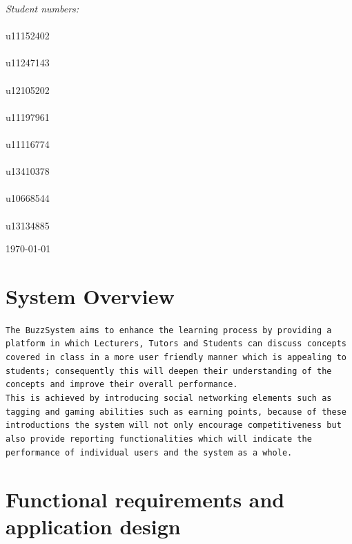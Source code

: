 \documentclass[a4paper,12pt]{report}
\begin{document}
\begin{titlepage}
\begin{center}
\begin{minipage}{0.4\textwidth}
\begin{flushright}
\emph{Student numbers:} \\
\emph{}\\
u11152402
\emph{}\\
\emph{}\\
u11247143
\emph{}\\
\emph{}\\
u12105202
\emph{}\\
\emph{}\\
u11197961
\emph{}\\
\emph{}\\
u11116774
\emph{}\\
\emph{}\\
u13410378
\emph{}\\
\emph{}\\
u10668544
\emph{}\\
\emph{}\\
u13134885


\end{flushright}
\end{minipage}
\vfill


{\large \today}
\end{center}
\end{titlepage}
\setcounter{chapter}{1}
\renewcommand{\thesection}{\arabic{section}}

\section{System Overview}
\texttt{The BuzzSystem aims to enhance the learning process by providing a platform in which Lecturers, Tutors and Students can discuss concepts covered in class in a more user friendly manner which is appealing to students; consequently this will deepen their understanding of the concepts and improve their overall performance. 
\emph{}\\
This is achieved by introducing social networking elements such as tagging and gaming abilities such as earning points, because of these introductions  the system will not only encourage competitiveness but also provide reporting functionalities which will indicate the performance of individual users and the system as a whole. 
}

\newpage
\section{Functional requirements and application design}
\end{document}
